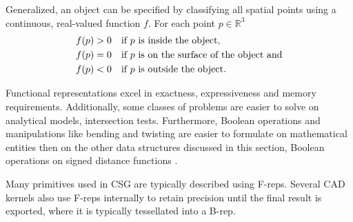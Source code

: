 \begin{description}
	Generalized, an object can be specified by classifying all spatial points using a continuous, real-valued function $f$.
	For each point $p \in \mathbb{R}^3$
	\begin{align}
		f(p) &> 0 \quad \text{if $p$ is inside the object,}               \notag \\
		f(p) &= 0 \quad \text{if $p$ is on the surface of the object and} \notag \\
		f(p) &< 0 \quad \text{if $p$ is outside the object.}              \notag
	\end{align}

	Functional representations excel in exactness, expressiveness and memory requirements.
	Additionally, some classes of problems are easier to solve on analytical models, \eg intersection tests.
	Furthermore, Boolean operations and manipulations like bending and twisting are easier to formulate on mathematical entities then on the other data structures discussed in this section, \cf Boolean operations on signed distance functions \cite{extended_marching_cubes}.

	Many primitives used in CSG are typically described using F-reps.
	Several CAD kernels also use F-reps internally to retain precision until the final result is exported, where it is typically tessellated into a B-rep.

\end{description}
